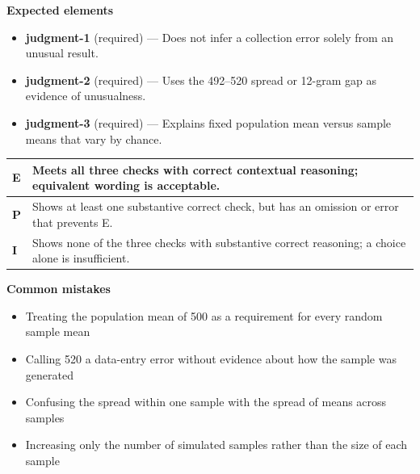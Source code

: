 \documentclass[11pt]{article}
\begin{document}

\textbf{Expected elements}
\begin{itemize}[leftmargin=1.5em,itemsep=2pt,topsep=2pt]
  \item \textbf{judgment-1} (required) --- Does not infer a collection error solely from an unusual result.
  \item \textbf{judgment-2} (required) --- Uses the 492--520 spread or 12-gram gap as evidence of unusualness.
  \item \textbf{judgment-3} (required) --- Explains fixed population mean versus sample means that vary by chance.
\end{itemize}

{\small\renewcommand{\arraystretch}{1.25}
\noindent\begin{tabular}{|p{0.5in}|p{5.9in}|}
\hline
\textbf{E} & Meets all three checks with correct contextual reasoning; equivalent wording is acceptable. \\ \hline
\textbf{P} & Shows at least one substantive correct check, but has an omission or error that prevents E. \\ \hline
\textbf{I} & Shows none of the three checks with substantive correct reasoning; a choice alone is insufficient. \\ \hline
\end{tabular}}

\textbf{Common mistakes}
\begin{itemize}[leftmargin=1.5em,itemsep=2pt,topsep=2pt]
  \item Treating the population mean of 500 as a requirement for every random sample mean
  \item Calling 520 a data-entry error without evidence about how the sample was generated
  \item Confusing the spread within one sample with the spread of means across samples
  \item Increasing only the number of simulated samples rather than the size of each sample
\end{itemize}

\clearpage
{}
\end{document}

